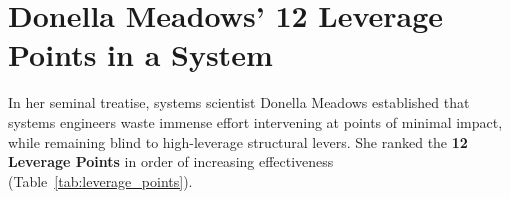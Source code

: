 \section{Donella Meadows' 12 Leverage Points in a System}
\label{sec:twelve_leverage_points}

In her seminal treatise, systems scientist Donella Meadows established that systems engineers waste immense effort intervening at points of minimal impact, while remaining blind to high-leverage structural levers. She ranked the \textbf{12 Leverage Points} in order of increasing effectiveness (Table~\ref{tab:leverage_points}).

